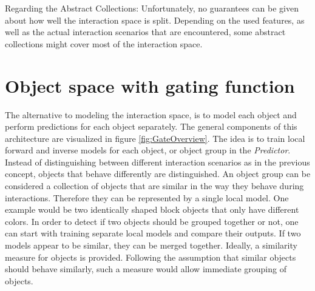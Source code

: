 Regarding the Abstract Collections:
Unfortunately, no guarantees can be given about how well the interaction space is split. Depending on the used features, as well as the actual interaction scenarios that are encountered, some abstract collections might cover most of the interaction space. 


\section{Object space with gating function \label{sec:gate}}

The alternative to modeling the interaction space, is to model each object and perform predictions for each object separately. 
The general components of this architecture are visualized in figure \ref{fig:GateOverview}.
The idea is to train local forward and inverse models for each object, or object group in the \textit{Predictor}. %
Instead of distinguishing between different interaction scenarios as in the previous concept, objects that behave differently are distinguished. 
An object group can be considered a collection of objects that are similar in the way they behave during interactions. Therefore they can be represented by a single local model. One example would be two identically shaped block objects that only have different colors. In order to detect if two objects should be grouped together or not, one can start with training separate local models and compare their outputs. If two models appear to be similar, they can be merged together. Ideally, a similarity measure for objects is provided. Following the assumption that similar objects should behave similarly, such a measure would allow immediate grouping of objects.

